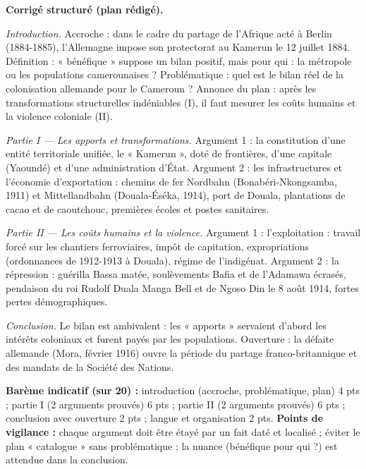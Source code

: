 \documentclass[11pt]{article}
\begin{document}
\begin{corrige}
\textbf{Corrigé structuré (plan rédigé).}

\emph{Introduction.} Accroche : dans le cadre du partage de l'Afrique acté à Berlin (1884-1885), l'Allemagne impose son protectorat au Kamerun le 12 juillet 1884. Définition : « bénéfique » suppose un bilan positif, mais pour qui : la métropole ou les populations camerounaises ? Problématique : quel est le bilan réel de la colonisation allemande pour le Cameroun ? Annonce du plan : après les transformations structurelles indéniables (I), il faut mesurer les coûts humains et la violence coloniale (II).

\emph{Partie I — Les apports et transformations.} Argument 1 : la constitution d'une entité territoriale unifiée, le « Kamerun », doté de frontières, d'une capitale (Yaoundé) et d'une administration d'État. Argument 2 : les infrastructures et l'économie d'exportation : chemins de fer Nordbahn (Bonabéri-Nkongsamba, 1911) et Mittellandbahn (Douala-Éséka, 1914), port de Douala, plantations de cacao et de caoutchouc, premières écoles et postes sanitaires.

\emph{Partie II — Les coûts humains et la violence.} Argument 1 : l'exploitation : travail forcé sur les chantiers ferroviaires, impôt de capitation, expropriations (ordonnances de 1912-1913 à Douala), régime de l'indigénat. Argument 2 : la répression : guérilla Bassa matée, soulèvements Bafia et de l'Adamawa écrasés, pendaison du roi Rudolf Duala Manga Bell et de Ngoso Din le 8 août 1914, fortes pertes démographiques.

\emph{Conclusion.} Le bilan est ambivalent : les « apports » servaient d'abord les intérêts coloniaux et furent payés par les populations. Ouverture : la défaite allemande (Mora, février 1916) ouvre la période du partage franco-britannique et des mandats de la Société des Nations.

\textbf{Barème indicatif (sur 20) :} introduction (accroche, problématique, plan) 4 pts ; partie I (2 arguments prouvés) 6 pts ; partie II (2 arguments prouvés) 6 pts ; conclusion avec ouverture 2 pts ; langue et organisation 2 pts.
\textbf{Points de vigilance :} chaque argument doit être étayé par un fait daté et localisé ; éviter le plan « catalogue » sans problématique ; la nuance (bénéfique pour qui ?) est attendue dans la conclusion.
\end{corrige}
\end{document}

